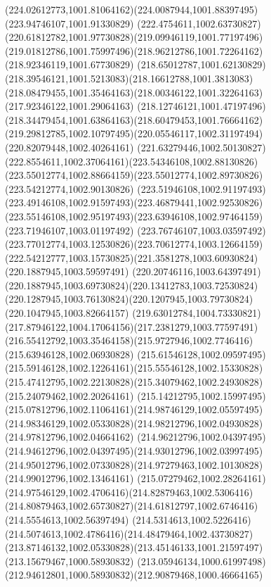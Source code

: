 {{		\curveto(224.02612773,1001.81064162)(224.0087944,1001.88397495)(223.94746107,1001.91330829)
		\curveto(222.4754611,1002.63730827)(220.61812782,1001.97730828)(219.09946119,1001.77197496)
		\curveto(219.01812786,1001.75997496)(218.96212786,1001.72264162)(218.92346119,1001.67730829)
		\curveto(218.65012787,1001.62130829)(218.39546121,1001.5213083)(218.16612788,1001.3813083)
		\curveto(218.08479455,1001.35464163)(218.00346122,1001.32264163)(217.92346122,1001.29064163)
		\curveto(218.12746121,1001.47197496)(218.34479454,1001.63864163)(218.60479453,1001.76664162)
		\curveto(219.29812785,1002.10797495)(220.05546117,1002.31197494)(220.82079448,1002.40264161)
		\curveto(221.63279446,1002.50130827)(222.8554611,1002.37064161)(223.54346108,1002.88130826)
		\curveto(223.55012774,1002.88664159)(223.55012774,1002.89730826)(223.54212774,1002.90130826)
		\curveto(223.51946108,1002.91197493)(223.49146108,1002.91597493)(223.46879441,1002.92530826)
		\curveto(223.55146108,1002.95197493)(223.63946108,1002.97464159)(223.71946107,1003.01197492)
		\curveto(223.76746107,1003.03597492)(223.77012774,1003.12530826)(223.70612774,1003.12664159)
		\curveto(222.54212777,1003.15730825)(221.3581278,1003.60930824)(220.1887945,1003.59597491)
		\curveto(220.20746116,1003.64397491)(220.1887945,1003.69730824)(220.13412783,1003.72530824)
		\curveto(220.1287945,1003.76130824)(220.1207945,1003.79730824)(220.1047945,1003.82664157)
		\curveto(219.63012784,1004.73330821)(217.87946122,1004.17064156)(217.2381279,1003.77597491)
		\curveto(216.55412792,1003.35464158)(215.9727946,1002.7746416)(215.63946128,1002.06930828)
		\curveto(215.61546128,1002.09597495)(215.59146128,1002.12264161)(215.55546128,1002.15330828)
		\curveto(215.47412795,1002.22130828)(215.34079462,1002.24930828)(215.24079462,1002.20264161)
		\curveto(215.14212795,1002.15997495)(215.07812796,1002.11064161)(214.98746129,1002.05597495)
		\curveto(214.98346129,1002.05330828)(214.98212796,1002.04930828)(214.97812796,1002.04664162)
		\curveto(214.96212796,1002.04397495)(214.94612796,1002.04397495)(214.93012796,1002.03997495)
		\curveto(214.95012796,1002.07330828)(214.97279463,1002.10130828)(214.99012796,1002.13464161)
		\curveto(215.07279462,1002.28264161)(214.97546129,1002.4706416)(214.82879463,1002.5306416)
		\curveto(214.80879463,1002.65730827)(214.61812797,1002.6746416)(214.5554613,1002.56397494)
		\curveto(214.5314613,1002.5226416)(214.5074613,1002.4786416)(214.48479464,1002.43730827)
		\curveto(213.87146132,1002.05330828)(213.45146133,1001.21597497)(213.15679467,1000.58930832)
		\curveto(213.05946134,1000.61997498)(212.94612801,1000.58930832)(212.90879468,1000.46664165)
}}
